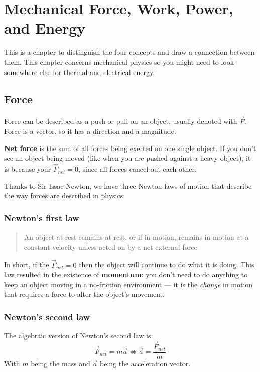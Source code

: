 \chapter{Mechanical Force, Work, Power, and Energy}
This is a chapter to distinguish the four concepts and draw a connection between them. This chapter concerns mechanical physics so you might need to look somewhere else for thermal and electrical energy.

\section{Force}
Force can be described as a push or pull on an object, usually denoted with $\vec{F}$. Force is a vector, so it has a direction and a magnitude. 

\textbf{Net force} is the sum of all forces being exerted on one single object. If you don't see an object being moved (like when you are pushed against a heavy object), it is because your $\vec{F}_{net}=0$, since all forces cancel out each other.

Thanks to Sir Issac Newton, we have three Newton laws of motion that describe the way forces are described in physics:
\subsection{Newton's first law}
\begin{quote}
    An object at rest remains at rest, or if in motion, remains in motion at a constant velocity unless acted on by a net external force 
\end{quote}

In short, if the $\vec{F}_{net} = 0$ then the object will continue to do what it is doing. This law resulted in the existence of \textbf{momentum}: you don't need to do anything to keep an object moving in a no-friction environment — it is the \textit{change} in motion that requires a force to alter the object's movement. 

\subsection{Newton's second law}
The algebraic version of Newton's second law is:
\begin{equation}
    \vec{F}_{net}=m\vec{a}
    \iff
    \vec{a}=\frac{\vec{F}_{net}}{m}
\end{equation}
With $m$ being the mass and $\vec{a}$ being the acceleration vector.

